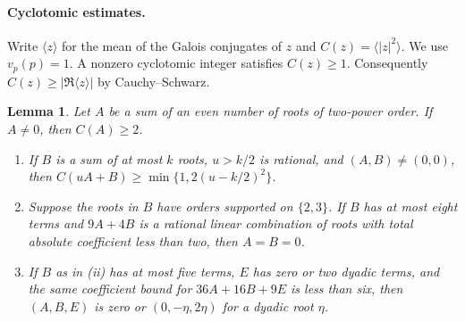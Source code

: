 \documentclass[11pt]{amsart}
\numberwithin{equation}{section}
\newtheorem{lemma}[theorem]{Lemma}
\theoremstyle{definition}
\theoremstyle{plain}
\begin{document}
\paragraph{Cyclotomic estimates.}
Write $\langle z\rangle$ for the mean of the Galois conjugates of $z$
and $C(z)=\langle |z|^2\rangle$. We use $v_p(p)=1$.
A nonzero cyclotomic integer satisfies $C(z)\ge1$. Consequently
$C(z)\ge|\Re\langle z\rangle|$ by Cauchy--Schwarz.

\begin{lemma}\label{result:coupled-gap}
Let $A$ be a sum of an even number of roots of two-power order. If $A\ne0$, then $C(A)\ge2$.
\begin{enumerate}[label=\textup{(\roman*)},nosep]
\item If $B$ is a sum of at most $k$ roots, $u>k/2$ is rational,
and $(A,B)\ne(0,0)$, then $C(uA+B)\ge\min\{1,2(u-k/2)^2\}$.
\item Suppose the roots in $B$ have orders supported on $\{2,3\}$.
If $B$ has at most eight terms and $9A+4B$ is a rational linear
combination of roots with total absolute coefficient less than two,
then $A=B=0$.
\item If $B$ as in \textup{(ii)} has at most five terms, $E$ has zero
or two dyadic terms, and the same coefficient bound for $36A+16B+9E$
is less than six, then $(A,B,E)$ is zero or $(0,-\eta,2\eta)$ for
a dyadic root $\eta$.
\end{enumerate}
\end{lemma}
\end{document}
